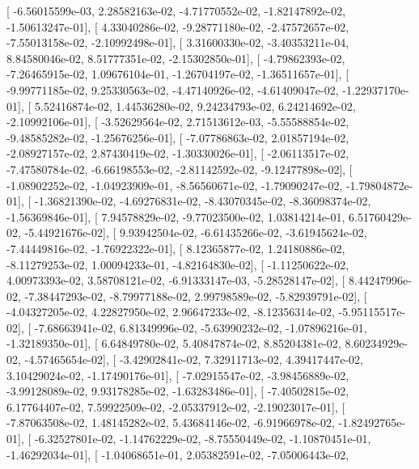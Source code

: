 \documentclass{article}
\begin{document}
       [ -6.56015599e-03,   2.28582163e-02,  -4.71770552e-02,
         -1.82147892e-02,  -1.50613247e-01],
       [  4.33040286e-02,  -9.28771180e-02,  -2.47572657e-02,
         -7.55013158e-02,  -2.10992498e-01],
       [  3.31600330e-02,  -3.40353211e-04,   8.84580046e-02,
          8.51777351e-02,  -2.15302850e-01],
       [ -4.79862393e-02,  -7.26465915e-02,   1.09676104e-01,
         -1.26704197e-02,  -1.36511657e-01],
       [ -9.99771185e-02,   9.25330563e-02,  -4.47140926e-02,
         -4.61409047e-02,  -1.22937170e-01],
       [  5.52416874e-02,   1.44536280e-02,   9.24234793e-02,
          6.24214692e-02,  -2.10992106e-01],
       [ -3.52629564e-02,   2.71513612e-03,  -5.55588854e-02,
         -9.48585282e-02,  -1.25676256e-01],
       [ -7.07786863e-02,   2.01857194e-02,  -2.08927157e-02,
          2.87430419e-02,  -1.30330026e-01],
       [ -2.06113517e-02,  -7.47580784e-02,  -6.66198553e-02,
         -2.81142592e-02,  -9.12477898e-02],
       [ -1.08902252e-02,  -1.04923909e-01,  -8.56560671e-02,
         -1.79090247e-02,  -1.79804872e-01],
       [ -1.36821390e-02,  -4.69276831e-02,  -8.43070345e-02,
         -8.36098374e-02,  -1.56369846e-01],
       [  7.94578829e-02,  -9.77023500e-02,   1.03814214e-01,
          6.51760429e-02,  -5.44921676e-02],
       [  9.93942504e-02,  -6.61435266e-02,  -3.61945624e-02,
         -7.44449816e-02,  -1.76922322e-01],
       [  8.12365877e-02,   1.24180886e-02,  -8.11279253e-02,
          1.00094233e-01,  -4.82164830e-02],
       [ -1.11250622e-02,   4.00973393e-02,   3.58708121e-02,
         -6.91333147e-03,  -5.28528147e-02],
       [  8.44247996e-02,  -7.38447293e-02,  -8.79977188e-02,
          2.99798589e-02,  -5.82939791e-02],
       [ -4.04327205e-02,   4.22827950e-02,   2.96647233e-02,
         -8.12356314e-02,  -5.95115517e-02],
       [ -7.68663941e-02,   6.81349996e-02,  -5.63990232e-02,
         -1.07896216e-01,  -1.32189350e-01],
       [  6.64849780e-02,   5.40847874e-02,   8.85204381e-02,
          8.60234929e-02,  -4.57465654e-02],
       [ -3.42902841e-02,   7.32911713e-02,   4.39417447e-02,
          3.10429024e-02,  -1.17490176e-01],
       [ -7.02915547e-02,  -3.98456889e-02,  -3.99128089e-02,
          9.93178285e-02,  -1.63283486e-01],
       [ -7.40502815e-02,   6.17764407e-02,   7.59922509e-02,
         -2.05337912e-02,  -2.19023017e-01],
       [ -7.87063508e-02,   1.48145282e-02,   5.43684146e-02,
         -6.91966978e-02,  -1.82492765e-01],
       [ -6.32527801e-02,  -1.14762229e-02,  -8.75550449e-02,
         -1.10870451e-01,  -1.46292034e-01],
       [ -1.04068651e-01,   2.05382591e-02,  -7.05006443e-02,
\end{document}
